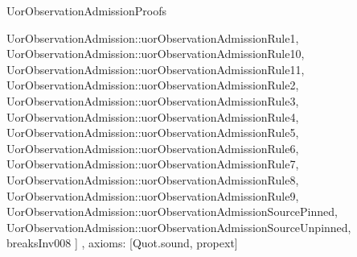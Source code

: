 \begin{lexlean}{UorObservationAdmissionProofs}
\begin{semanticmodule}
{{      UorObservationAdmission::uorObservationAdmissionRule1,
      UorObservationAdmission::uorObservationAdmissionRule10,
      UorObservationAdmission::uorObservationAdmissionRule11,
      UorObservationAdmission::uorObservationAdmissionRule2,
      UorObservationAdmission::uorObservationAdmissionRule3,
      UorObservationAdmission::uorObservationAdmissionRule4,
      UorObservationAdmission::uorObservationAdmissionRule5,
      UorObservationAdmission::uorObservationAdmissionRule6,
      UorObservationAdmission::uorObservationAdmissionRule7,
      UorObservationAdmission::uorObservationAdmissionRule8,
      UorObservationAdmission::uorObservationAdmissionRule9,
      UorObservationAdmission::uorObservationAdmissionSourcePinned,
      UorObservationAdmission::uorObservationAdmissionSourceUnpinned,
      breaksInv008
    ]
  },
  axioms: [Quot.sound, propext]
}
\end{semanticmodule}
\end{lexlean}
